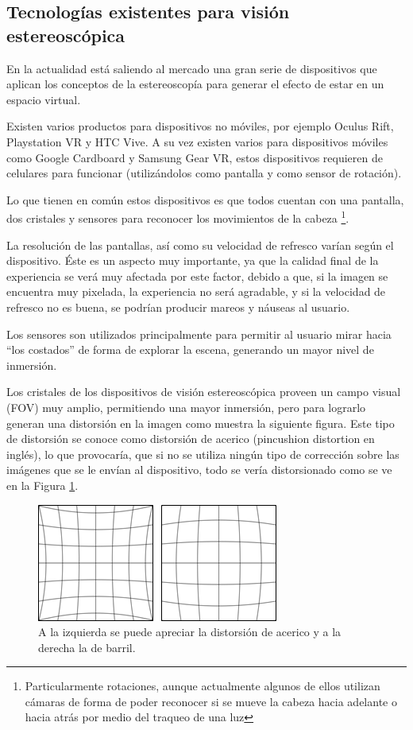 \documentclass[12pt]{article}
\begin{document}
\subsection{Tecnologías existentes para visión estereoscópica}
En la actualidad está saliendo al mercado una gran serie de dispositivos que aplican los conceptos de la estereoscopía para generar el efecto de estar en un espacio virtual.

Existen varios productos para dispositivos no móviles, por ejemplo  Oculus Rift\cite{oculus}, Playstation VR\cite{psvr} y HTC Vive\cite{htcvive}. A su vez existen varios para dispositivos móviles como  Google Cardboard\cite{cardboard} y  Samsung Gear VR\cite{samsungvr}, estos dispositivos requieren de celulares para funcionar (utilizándolos como pantalla y como sensor de rotación).

Lo que tienen en común estos dispositivos es que todos cuentan con una pantalla, dos cristales y sensores para reconocer los movimientos de la cabeza \footnote{Particularmente rotaciones, aunque actualmente algunos de ellos utilizan cámaras de forma de poder reconocer si se mueve la cabeza hacia adelante o hacia atrás por medio del traqueo de una luz}.

La resolución de las pantallas, así como su velocidad de refresco varían según el dispositivo. Éste es un aspecto muy importante, ya que la calidad final de la experiencia se verá muy afectada por este factor, debido a que, si la imagen se encuentra muy pixelada, la experiencia no será agradable, y si la velocidad de refresco no es buena, se podrían producir mareos y náuseas al usuario.

Los sensores son utilizados principalmente para permitir al usuario mirar hacia “los costados” de forma de explorar la escena, generando un mayor nivel de inmersión.

Los cristales de los dispositivos de visión estereoscópica proveen un campo visual (FOV) muy amplio, permitiendo una mayor inmersión, pero para lograrlo generan una distorsión\cite{oculusrendering} en la imagen como muestra la siguiente figura. Este tipo de distorsión se conoce como  distorsión de acerico (pincushion distortion en inglés), lo que provocaría, que si no se utiliza ningún tipo de corrección sobre las imágenes que se le envían al dispositivo, todo se vería distorsionado como se ve en la Figura \ref{dist}.
\begin{figure}[h!]
\includegraphics[width =0.6\linewidth, center]{ace-bar.png}
\caption{ A la izquierda se puede apreciar la distorsión de acerico y a la derecha la de barril.}
\label{dist}
\end{figure}
\end{document}
